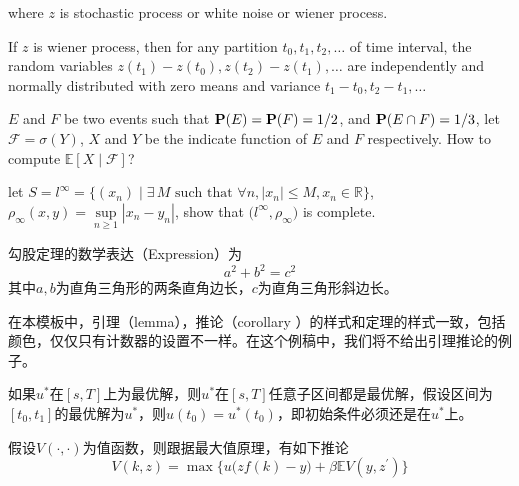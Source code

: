 \documentclass[color=green,mathpazo,titlestyle=hang,11pt]{elegantbook}
\begin{document}
where $z$ is stochastic process or white noise or wiener process.

\begin{newdef}
If $z$ is wiener process, then for any partition $t_0,t_1,t_2,\ldots$ of time interval, the random variables $z(t_1)-z(t_0),z(t_2)-z(t_1),\ldots$ are independently and normally distributed with zero means and variance $t_1-t_0,t_2-t_1,\ldots$
\end{newdef}

\lipsum[5]

\begin{example}
$E$ and $F$ be two events such that $\mathbf{P}(E)=\mathbf{P}(F)=1/2$, and $\mathbf{P}(E\cap F)=1/3$, let $\mathscr{F}=\sigma(Y)$,  $X$ and $Y$ be the indicate function of $E$ and $F$ respectively. How to compute $\mathbb{E}[ X\mid \mathscr{F} ]$?
\end{example}
\lipsum[4]
\begin{exercise}
let $S=l^\infty=\big\{(x_n)\mid \exists\, M \text{ such that } \forall n, |x_n|\leq M,x_n\in \mathbb{R}\big\}$, $\rho_{\infty}(x,y)=\sup\limits_{n\geq 1}|x_n-y_n|$, show that $\big(l^\infty,\rho_{\infty}\big)$ is complete.
\end{exercise}

\begin{newthem}[勾股定理]
勾股定理的数学表达（Expression）为
\[a^2+b^2=c^2\]
其中$a,b$为直角三角形的两条直角边长，$c$为直角三角形斜边长。
\end{newthem}

\begin{note}
在本模板中，引理（lemma），推论（corollary ）的样式和定理的样式一致，包括颜色，仅仅只有计数器的设置不一样。在这个例稿中，我们将不给出引理推论的例子。
\end{note}


\lipsum[4]

\begin{newprop}[最优性原理]
如果$u^*$在$[s,T]$上为最优解，则$u^*$在$[s,T]$任意子区间都是最优解，假设区间为$[t_0,t_1]$的最优解为$u^*$，则$u(t_0)=u^{*}(t_0)$，即初始条件必须还是在$u^*$上。
\end{newprop}

\lipsum[5-6]
\begin{newcorol}
假设$V(\cdot,\cdot)$为值函数，则跟据最大值原理，有如下推论
\[
V(k,z)=\max\Big\{u\big(zf(k)-y\big)+\beta \mathbb{E}V(y,z^\prime)\Big\}
\]
\end{newcorol}
\end{document}
